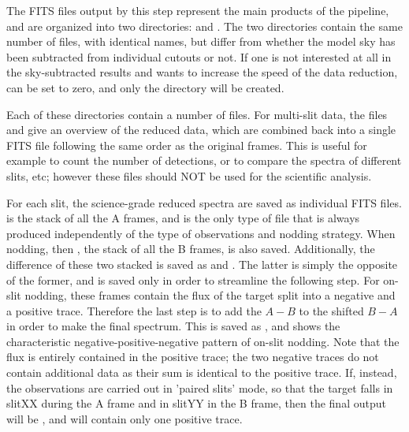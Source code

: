 \documentclass[a4paper]{article}
\begin{document}
\begin{sloppypar}
The FITS files output by this step represent the main products of the pipeline, and are organized into two directories:  and . The two directories contain the same number of files, with identical names, but differ from whether the model sky has been subtracted from individual cutouts or not. If one is not interested at all in the sky-subtracted results and wants to increase the speed of the data reduction,  can be set to zero, and only the  directory will be created.

Each of these directories contain a number of files. For multi-slit data, the files  and  give an overview of the reduced data, which are combined back into a single FITS file following the same order as the original frames. This is useful for example to count the number of detections, or to compare the spectra of different slits, etc; however these files should NOT be used for the scientific analysis.

For each slit, the science-grade reduced spectra are saved as individual FITS files.  is the stack of all the A frames, and is the only type of file that is always produced independently of the type of observations and nodding strategy. When nodding, then , the stack of all the B frames, is also saved. Additionally, the difference of these two stacked is saved as  and . The latter is simply the opposite of the former, and is saved only in order to streamline the following step. For on-slit nodding, these frames contain the flux of the target split into a negative and a positive trace. Therefore the last step is to add the $A-B$ to the shifted $B-A$ in order to make the final spectrum. This is saved as , and shows the characteristic negative-positive-negative pattern of on-slit nodding. Note that the flux is entirely contained in the positive trace; the two negative traces do not contain additional data as their sum is identical to the positive trace. If, instead, the observations are carried out in 'paired slits' mode, so that the target falls in slitXX during the A frame and in slitYY in the B frame, then the final output will be , and will contain only one positive trace.


\end{sloppypar}
\end{document}
